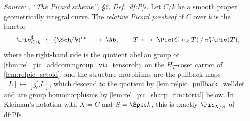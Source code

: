 \begin{definition}\leanok
  \label{def:rel_pic_sharp}

  \textit{Source: \cite{kleiman-picard}, ``The Picard scheme'', \S 2,
  Def.~df:Pfs.}
  Let \(C/k\) be a smooth proper geometrically integral curve. The
  \emph{relative Picard presheaf} of \(C\) over \(k\) is the functor
  \[
    \Pic^\sharp_{C/k} \;\;\colon\;\; (\Sch/k)^{op} \;\longrightarrow\; \Ab,
    \qquad
    T \;\longmapsto\; \Pic(C \times_k T) \,/\, \pi_T^*\Pic(T),
  \]
  where the right-hand side is the quotient abelian group of
  \cref{thm:rel_pic_addcommgroup_via_tensorobj} on the \(H_T\)-coset
  carrier of \cref{lem:relpic_setoid}, and the structure morphisms are the
  pullback maps \([L] \mapsto [g_C^* L]\), which descend to the quotient by
  \cref{lem:relpic_pullback_welldef} and are group homomorphisms by
  \cref{lem:rel_pic_sharp_functorial} below. In Kleiman's notation with
  \(X = C\) and \(S = \Spec k\), this is exactly \(\Pic_{X/S}\) of df:Pfs.
\end{definition}


